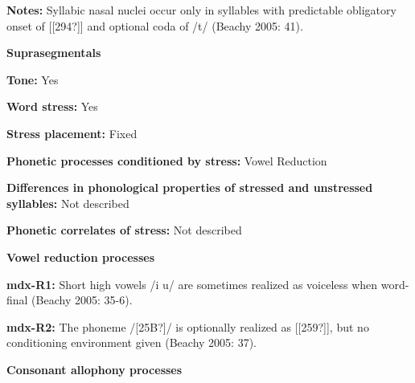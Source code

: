 \begin{styleBody}
\textbf{Notes: }Syllabic nasal nuclei occur only in syllables with predictable obligatory onset of [[294?]] and optional coda of /t/ (Beachy 2005: 41).
\end{styleBody}

\begin{styleBody}
\textbf{Suprasegmentals}
\end{styleBody}

\begin{styleBody}
\textbf{Tone: }Yes
\end{styleBody}

\begin{styleBody}
\textbf{Word stress:} Yes
\end{styleBody}

\begin{styleBody}
\textbf{Stress placement:} Fixed
\end{styleBody}

\begin{styleBody}
\textbf{Phonetic processes conditioned by stress:} Vowel Reduction
\end{styleBody}

\begin{styleBody}
\textbf{Differences in phonological properties of stressed and unstressed syllables:} Not described
\end{styleBody}

\begin{styleBody}
\textbf{Phonetic correlates of stress: }Not described
\end{styleBody}

\begin{styleBody}
\textbf{Vowel reduction processes}
\end{styleBody}

\begin{styleBody}
\textbf{mdx-R1:} Short high vowels /i u/ are sometimes realized as voiceless when word-final (Beachy 2005: 35-6).
\end{styleBody}

\begin{styleBody}
\textbf{mdx-R2:} The phoneme /[25B?]/ is optionally realized as [[259?]], but no conditioning environment given (Beachy 2005: 37).
\end{styleBody}

\begin{styleBody}
\textbf{Consonant allophony processes}
\end{styleBody}


